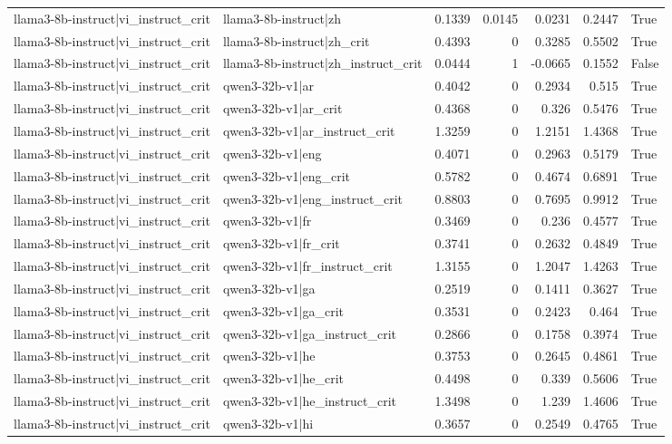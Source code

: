 \begin{table}
\begin{tabular}{l l r r r r l}
llama3-8b-instruct|vi_instruct_crit & llama3-8b-instruct|zh & 0.1339 & 0.0145 & 0.0231 & 0.2447 & True \\
llama3-8b-instruct|vi_instruct_crit & llama3-8b-instruct|zh_crit & 0.4393 & 0 & 0.3285 & 0.5502 & True \\
llama3-8b-instruct|vi_instruct_crit & llama3-8b-instruct|zh_instruct_crit & 0.0444 & 1 & -0.0665 & 0.1552 & False \\
llama3-8b-instruct|vi_instruct_crit & qwen3-32b-v1|ar & 0.4042 & 0 & 0.2934 & 0.515 & True \\
llama3-8b-instruct|vi_instruct_crit & qwen3-32b-v1|ar_crit & 0.4368 & 0 & 0.326 & 0.5476 & True \\
llama3-8b-instruct|vi_instruct_crit & qwen3-32b-v1|ar_instruct_crit & 1.3259 & 0 & 1.2151 & 1.4368 & True \\
llama3-8b-instruct|vi_instruct_crit & qwen3-32b-v1|eng & 0.4071 & 0 & 0.2963 & 0.5179 & True \\
llama3-8b-instruct|vi_instruct_crit & qwen3-32b-v1|eng_crit & 0.5782 & 0 & 0.4674 & 0.6891 & True \\
llama3-8b-instruct|vi_instruct_crit & qwen3-32b-v1|eng_instruct_crit & 0.8803 & 0 & 0.7695 & 0.9912 & True \\
llama3-8b-instruct|vi_instruct_crit & qwen3-32b-v1|fr & 0.3469 & 0 & 0.236 & 0.4577 & True \\
llama3-8b-instruct|vi_instruct_crit & qwen3-32b-v1|fr_crit & 0.3741 & 0 & 0.2632 & 0.4849 & True \\
llama3-8b-instruct|vi_instruct_crit & qwen3-32b-v1|fr_instruct_crit & 1.3155 & 0 & 1.2047 & 1.4263 & True \\
llama3-8b-instruct|vi_instruct_crit & qwen3-32b-v1|ga & 0.2519 & 0 & 0.1411 & 0.3627 & True \\
llama3-8b-instruct|vi_instruct_crit & qwen3-32b-v1|ga_crit & 0.3531 & 0 & 0.2423 & 0.464 & True \\
llama3-8b-instruct|vi_instruct_crit & qwen3-32b-v1|ga_instruct_crit & 0.2866 & 0 & 0.1758 & 0.3974 & True \\
llama3-8b-instruct|vi_instruct_crit & qwen3-32b-v1|he & 0.3753 & 0 & 0.2645 & 0.4861 & True \\
llama3-8b-instruct|vi_instruct_crit & qwen3-32b-v1|he_crit & 0.4498 & 0 & 0.339 & 0.5606 & True \\
llama3-8b-instruct|vi_instruct_crit & qwen3-32b-v1|he_instruct_crit & 1.3498 & 0 & 1.239 & 1.4606 & True \\
llama3-8b-instruct|vi_instruct_crit & qwen3-32b-v1|hi & 0.3657 & 0 & 0.2549 & 0.4765 & True \\

\end{tabular}
\end{table}

